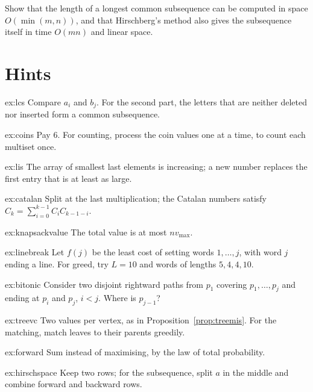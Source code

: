 \begin{exercise}[$\star\star$]\label{ex:hirschspace}
Show that the length of a longest common subsequence can be computed in space $O(\min(m,n))$, and that Hirschberg's method also gives the subsequence itself in time $O(mn)$ and linear space.
\end{exercise}

\section{Hints}

\begin{hint}{ex:lcs}
Compare $a_i$ and $b_j$. For the second part, the letters that are neither deleted nor inserted form a common subsequence.
\end{hint}
\begin{hint}{ex:coins}
Pay $6$. For counting, process the coin values one at a time, to count each multiset once.
\end{hint}
\begin{hint}{ex:lis}
The array of smallest last elements is increasing; a new number replaces the first entry that is at least as large.
\end{hint}
\begin{hint}{ex:catalan}
Split at the last multiplication; the Catalan numbers satisfy $C_k=\sum_{i=0}^{k-1}C_iC_{k-1-i}$.
\end{hint}
\begin{hint}{ex:knapsackvalue}
The total value is at most $nv_{\max}$.
\end{hint}
\begin{hint}{ex:linebreak}
Let $f(j)$ be the least cost of setting words $1,\dots,j$, with word $j$ ending a line. For greed, try $L=10$ and words of lengths $5,4,4,10$.
\end{hint}
\begin{hint}{ex:bitonic}
Consider two disjoint rightward paths from $p_1$ covering $p_1,\dots,p_j$ and ending at $p_i$ and $p_j$, $i<j$. Where is $p_{j-1}$?
\end{hint}
\begin{hint}{ex:treevc}
Two values per vertex, as in Proposition~\ref{prop:treemis}. For the matching, match leaves to their parents greedily.
\end{hint}
\begin{hint}{ex:forward}
Sum instead of maximising, by the law of total probability.
\end{hint}
\begin{hint}{ex:hirschspace}
Keep two rows; for the subsequence, split $a$ in the middle and combine forward and backward rows.
\end{hint}

